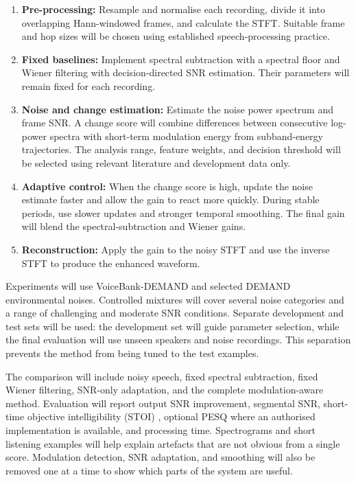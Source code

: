 \documentclass[11pt,a4paper]{article}
\begin{document}
\begin{enumerate}[leftmargin=1.7em,itemsep=0.25em,topsep=0.25em]
  \item \textbf{Pre-processing:} Resample and normalise each recording, divide it into overlapping Hann-windowed frames, and calculate the STFT. Suitable frame and hop sizes will be chosen using established speech-processing practice.
  \item \textbf{Fixed baselines:} Implement spectral subtraction with a spectral floor and Wiener filtering with decision-directed SNR estimation. Their parameters will remain fixed for each recording.
  \item \textbf{Noise and change estimation:} Estimate the noise power spectrum and frame SNR. A change score will combine differences between consecutive log-power spectra with short-term modulation energy from subband-energy trajectories. The analysis range, feature weights, and decision threshold will be selected using relevant literature and development data only.
  \item \textbf{Adaptive control:} When the change score is high, update the noise estimate faster and allow the gain to react more quickly. During stable periods, use slower updates and stronger temporal smoothing. The final gain will blend the spectral-subtraction and Wiener gains.
  \item \textbf{Reconstruction:} Apply the gain to the noisy STFT and use the inverse STFT to produce the enhanced waveform.
\end{enumerate}

Experiments will use VoiceBank-DEMAND and selected DEMAND environmental noises. Controlled mixtures will cover several noise categories and a range of challenging and moderate SNR conditions. Separate development and test sets will be used: the development set will guide parameter selection, while the final evaluation will use unseen speakers and noise recordings. This separation prevents the method from being tuned to the test examples.

The comparison will include noisy speech, fixed spectral subtraction, fixed Wiener filtering, SNR-only adaptation, and the complete modulation-aware method. Evaluation will report output SNR improvement, segmental SNR, short-time objective intelligibility (STOI) \cite{taal2011}, optional PESQ where an authorised implementation is available, and processing time. Spectrograms and short listening examples will help explain artefacts that are not obvious from a single score. Modulation detection, SNR adaptation, and smoothing will also be removed one at a time to show which parts of the system are useful.
\end{document}
